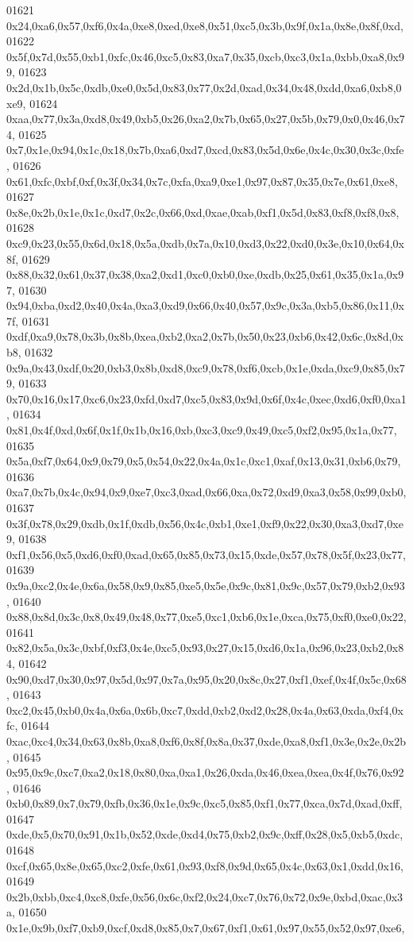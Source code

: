 \begin{DoxyCode}
01621   0x24,0xa6,0x57,0xf6,0x4a,0xe8,0xed,0xe8,0x51,0xc5,0x3b,0x9f,0x1a,0x8e,0x8f,0xd,
01622   0x5f,0x7d,0x55,0xb1,0xfc,0x46,0xc5,0x83,0xa7,0x35,0xcb,0xc3,0x1a,0xbb,0xa8,0x99,
01623   0x2d,0x1b,0x5c,0xdb,0xe0,0x5d,0x83,0x77,0x2d,0xad,0x34,0x48,0xdd,0xa6,0xb8,0xe9,
01624   0xaa,0x77,0x3a,0xd8,0x49,0xb5,0x26,0xa2,0x7b,0x65,0x27,0x5b,0x79,0x0,0x46,0x74,
01625   0x7,0x1e,0x94,0x1c,0x18,0x7b,0xa6,0xd7,0xcd,0x83,0x5d,0x6e,0x4c,0x30,0x3c,0xfe,
01626   0x61,0xfc,0xbf,0xf,0x3f,0x34,0x7c,0xfa,0xa9,0xe1,0x97,0x87,0x35,0x7e,0x61,0xe8,
01627   0x8e,0x2b,0x1e,0x1c,0xd7,0x2c,0x66,0xd,0xae,0xab,0xf1,0x5d,0x83,0xf8,0xf8,0x8,
01628   0xc9,0x23,0x55,0x6d,0x18,0x5a,0xdb,0x7a,0x10,0xd3,0x22,0xd0,0x3e,0x10,0x64,0x8f,
01629   0x88,0x32,0x61,0x37,0x38,0xa2,0xd1,0xc0,0xb0,0xe,0xdb,0x25,0x61,0x35,0x1a,0x97,
01630   0x94,0xba,0xd2,0x40,0x4a,0xa3,0xd9,0x66,0x40,0x57,0x9c,0x3a,0xb5,0x86,0x11,0x7f,
01631   0xdf,0xa9,0x78,0x3b,0x8b,0xea,0xb2,0xa2,0x7b,0x50,0x23,0xb6,0x42,0x6c,0x8d,0xb8,
01632   0x9a,0x43,0xdf,0x20,0xb3,0x8b,0xd8,0xc9,0x78,0xf6,0xcb,0x1e,0xda,0xc9,0x85,0x79,
01633   0x70,0x16,0x17,0xc6,0x23,0xfd,0xd7,0xc5,0x83,0x9d,0x6f,0x4c,0xec,0xd6,0xf0,0xa1,
01634   0x81,0x4f,0xd,0x6f,0x1f,0x1b,0x16,0xb,0xc3,0xc9,0x49,0xc5,0xf2,0x95,0x1a,0x77,
01635   0x5a,0xf7,0x64,0x9,0x79,0x5,0x54,0x22,0x4a,0x1c,0xc1,0xaf,0x13,0x31,0xb6,0x79,
01636   0xa7,0x7b,0x4c,0x94,0x9,0xe7,0xc3,0xad,0x66,0xa,0x72,0xd9,0xa3,0x58,0x99,0xb0,
01637   0x3f,0x78,0x29,0xdb,0x1f,0xdb,0x56,0x4c,0xb1,0xe1,0xf9,0x22,0x30,0xa3,0xd7,0xe9,
01638   0xf1,0x56,0x5,0xd6,0xf0,0xad,0x65,0x85,0x73,0x15,0xde,0x57,0x78,0x5f,0x23,0x77,
01639   0x9a,0xc2,0x4e,0x6a,0x58,0x9,0x85,0xe5,0x5e,0x9c,0x81,0x9c,0x57,0x79,0xb2,0x93,
01640   0x88,0x8d,0x3c,0x8,0x49,0x48,0x77,0xe5,0xc1,0xb6,0x1e,0xca,0x75,0xf0,0xe0,0x22,
01641   0x82,0x5a,0x3c,0xbf,0xf3,0x4e,0xc5,0x93,0x27,0x15,0xd6,0x1a,0x96,0x23,0xb2,0x84,
01642   0x90,0xd7,0x30,0x97,0x5d,0x97,0x7a,0x95,0x20,0x8c,0x27,0xf1,0xef,0x4f,0x5c,0x68,
01643   0xc2,0x45,0xb0,0x4a,0x6a,0x6b,0xc7,0xdd,0xb2,0xd2,0x28,0x4a,0x63,0xda,0xf4,0xfc,
01644   0xac,0xc4,0x34,0x63,0x8b,0xa8,0xf6,0x8f,0x8a,0x37,0xde,0xa8,0xf1,0x3e,0x2e,0x2b,
01645   0x95,0x9c,0xc7,0xa2,0x18,0x80,0xa,0xa1,0x26,0xda,0x46,0xea,0xea,0x4f,0x76,0x92,
01646   0xb0,0x89,0x7,0x79,0xfb,0x36,0x1e,0x9c,0xc5,0x85,0xf1,0x77,0xca,0x7d,0xad,0xff,
01647   0xde,0x5,0x70,0x91,0x1b,0x52,0xde,0xd4,0x75,0xb2,0x9c,0xff,0x28,0x5,0xb5,0xdc,
01648   0xcf,0x65,0x8e,0x65,0xc2,0xfe,0x61,0x93,0xf8,0x9d,0x65,0x4c,0x63,0x1,0xdd,0x16,
01649   0x2b,0xbb,0xc4,0xc8,0xfe,0x56,0x6c,0xf2,0x24,0xc7,0x76,0x72,0x9e,0xbd,0xac,0x3a,
01650   0x1e,0x9b,0xf7,0xb9,0xcf,0xd8,0x85,0x7,0x67,0xf1,0x61,0x97,0x55,0x52,0x97,0xe6,

\end{DoxyCode}
